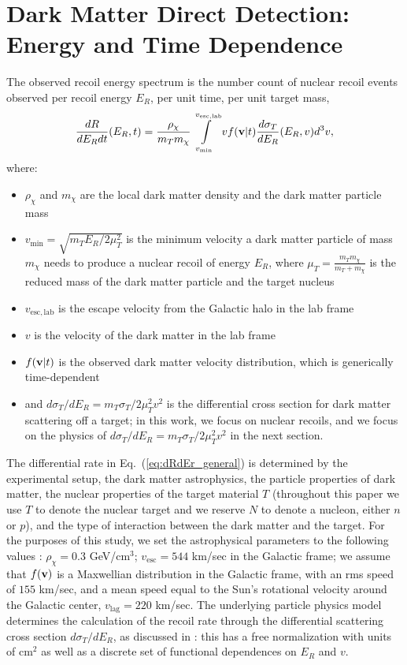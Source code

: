 \documentclass[11pt]{article}
\newcommand{\Eq}[1]{Eq.~(\ref{#1})} \newcommand{\Eqs}[2]{Eqs.~(\ref{#1}) and (\ref{#2})} \newcommand{\Eqm}[2]{Eqs.~(\ref{#1}) through (\ref{#2})}
\begin{document}
\section{Dark Matter Direct Detection: Energy and Time Dependence}

The observed recoil energy spectrum is the number count of nuclear recoil events observed per recoil energy $E_R$, per unit time, per unit target mass,
\begin{equation}
\frac{dR}{dE_R dt}(E_R,t) =  \frac{\rho_\chi}{m_T m_\chi} \int\limits_{v_{\mathrm{min}}}^{v_{\mathrm{esc, lab}}}  v f(\mathrm{\mbox{\bf{v}}}|t) \frac{d\sigma_T}{dE_R} (E_R,v) d^3v ,
\label{eq:dRdEr_general}
\end{equation}
where:
\begin{itemize}
\item $\rho_\chi$ and $m_\chi$ are the local dark matter density and the dark matter particle mass
\item $v_\mathrm{min} = \sqrt{m_T E_R/2\mu_T^2}$ is the minimum velocity a dark matter particle of mass $m_\chi$ needs to produce a nuclear recoil of energy $E_R$, where $\mu_T=\frac{m_Tm_\chi}{m_T+m_\chi}$ is the reduced mass of the dark matter particle and the target nucleus
\item $v_{\mathrm{esc, lab}}$ is the escape velocity from the Galactic halo in the lab frame
\item $v$ is the velocity of the dark matter in the lab frame
\item $f(\mathrm{\mbox{\bf{v}}}|t)$ is the observed dark matter velocity distribution, which is generically time-dependent
\item and $d\sigma_T/dE_R=m_T \sigma_T /2\mu_T^2 v^2$ is the differential cross section for dark matter scattering off a target; in this work, we focus on nuclear recoils, and we focus on the physics of $d\sigma_T/dE_R=m_T \sigma_T /2\mu_T^2 v^2$ in the next section.
\end{itemize}
The differential rate in \Eq{eq:dRdEr_general} is determined by the experimental setup, the dark matter astrophysics, the particle properties of dark matter, the nuclear properties of the target material $T$ (throughout this paper we use $T$ to denote the nuclear target and we reserve $N$ to denote a nucleon, either $n$ or $p$), and the type of interaction between the dark matter and the target. For the purposes of this study, we set the astrophysical parameters to the following values \cite{Bovy:2013raa}: $\rho_\chi=0.3$ GeV/cm$^3$; $v_{\mathrm{esc}} = 544$ km/sec in the Galactic frame; we assume that $f(\mathrm{\mbox{\bf{v}}})$ is a Maxwellian distribution in the Galactic frame, with an rms speed of $155$ km/sec, and a mean speed equal to the Sun's rotational velocity around the Galactic center, $v_\textrm{lag}=220$ km/sec. The underlying particle physics model determines the calculation of the recoil rate through the differential scattering cross section ${d\sigma_T}/{dE_R}$, as discussed in \cite{Gluscevic:2015sqa,Gresham:2014vja}: this has a free normalization with units of cm${}^2$ as well as a discrete set of functional dependences on $E_R$ and $v$.
\end{document}
